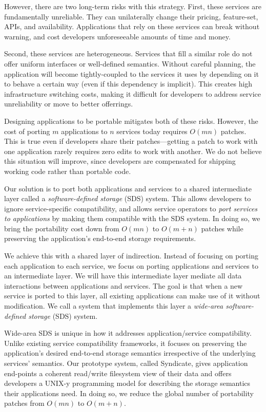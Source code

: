 However, there are two long-term risks with this strategy.  First, these
services are fundamentally unreliable.  They can unilaterally
change their pricing, feature-set, APIs, and availability.
Applications that rely on these services can break without warning,
and cost developers unforeseeable amounts of time and money.

Second, these services are heterogeneous.  Services that fill a similar role
do not offer uniform interfaces or well-defined semantics.
Without careful planning, the application will become tightly-coupled to the
services it uses by depending on it to behave a certain way (even if this
dependency is implicit).  This creates high infrastructure switching costs, making it
difficult for developers to address service unreliability or move to better
offerrings.

Designing applications to be portable mitigates both of
these risks.   However, the cost of porting $m$ applications to $n$ services
today requires $O(mn)$ patches.  This is true even if developers share their
patches---getting a patch to work with one application rarely requires zero
edits to work with another.  We do not believe this situation
will improve, since developers are compensated for shipping working
code rather than portable code.

Our solution is to port both applications and services to a shared
intermediate layer called a \emph{software-defined storage} (SDS) system.
This allows developers to ignore service-specific compatibility, and allows service
operators to \emph{port services to applications} by making them compatible with
the SDS system.  In doing so, we bring the portability cost down from
$O(mn)$ to $O(m + n)$ patches while preserving the application's end-to-end
storage requirements.

We achieve this with a shared layer of indirection.  Instead of focusing on
porting each application to each service, we focus on porting applications and
services to an intermediate layer.  We will have this intermediate layer mediate all
data interactions between applications and services.  The goal is that when a new service
is ported to this layer, all existing applications can make use of it without
modification.  We call a system that implements this layer a
\textit{wide-area software-defined storage} (SDS) system.

Wide-area SDS is unique in how it addresses application/service compatibility.
Unlike existing service compatibility frameworks, it focuses on preserving
the application's desired end-to-end storage semantics
irrespective of the underlying services' semantics.  Our prototype
system, called Syndicate, gives application end-points a coherent read/write
filesystem view of their data and offers developers a UNIX-y programming model
for describing the storage semantics their applications need.  In doing so, we
reduce the global number of portability patches from $O(mn)$ to $O(m + n)$.

